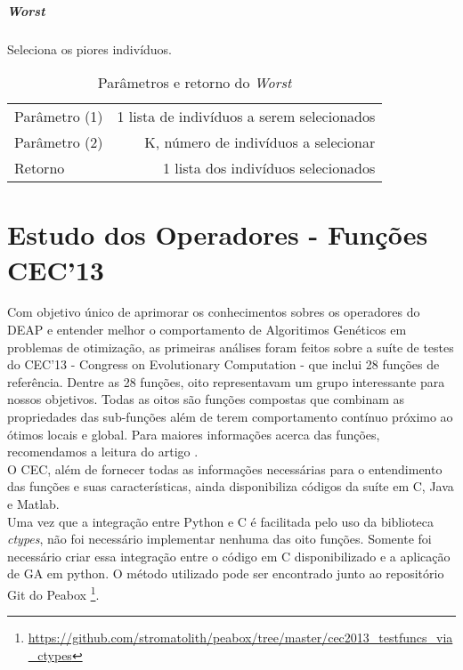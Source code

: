 \subparagraph{Worst}
Seleciona os piores indivíduos.\\

\begin{table}[!h]
  \begin{center}
  \begin{tabular}{|l|r|}
    \hline
    Parâmetro (1) & 1 lista de indivíduos a serem selecionados \\
    Parâmetro (2) & K, número de indivíduos a selecionar \\
    Retorno & 1 lista dos indivíduos selecionados\\
    \hline    
  \end{tabular}
  \end{center}
  \caption{Parâmetros e retorno do {\it Worst}}
  \label{Worst}
\end{table}

\clearpage

\section{Estudo dos Operadores - Funções CEC'13}
Com objetivo único de aprimorar os conhecimentos sobres os operadores do DEAP e entender melhor o comportamento de Algoritimos Genéticos em problemas de otimização, as primeiras análises foram feitos sobre a suíte de testes do CEC'13 - Congress on Evolutionary Computation - que inclui 28 funções de referência. Dentre as 28 funções, oito representavam um grupo interessante para nossos objetivos. Todas as oitos são funções compostas que combinam as propriedades das sub-funções além de terem comportamento contínuo próximo ao ótimos locais e global. Para maiores informações acerca das funções, recomendamos a leitura do artigo \cite{liang2013problem}.\\

O CEC, além de fornecer todas as informações necessárias para o entendimento das funções e suas características, ainda disponibiliza códigos da suíte em C, Java e Matlab.\\%

Uma vez que a integração entre Python e C é facilitada pelo uso da biblioteca {\it ctypes}, não foi necessário implementar nenhuma das oito funções. Somente foi necessário criar essa integração entre o código em C disponibilizado e a aplicação de GA em python. O método utilizado pode ser encontrado junto ao repositório Git do Peabox \footnote[6]{\url {https://github.com/stromatolith/peabox/tree/master/cec2013_testfuncs_via_ctypes}}.\\




